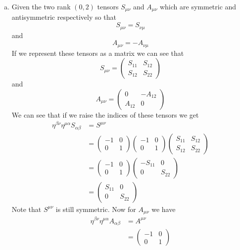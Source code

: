 \documentclass[11pt]{article}
\numberwithin{equation}{section}
\begin{document}
\begin{enumerate}[(a)]
\item
Given the two rank $(0,2)$ tensors $S_{\mu\nu}$ and $A_{\mu\nu}$ which are symmetric and antisymmetric respectively so that
$$S_{\mu\nu} = S_{\nu\mu}$$
and 
$$A_{\mu\nu} = -A_{\nu\mu}$$
If we represent these tensors as a matrix we can see that
$$S_{\mu\nu} = \left(\begin{array}{cc}
		S_{11} 	&S_{12}\\
		S_{12} 	&S_{22}
		\end{array}\right)$$
and
$$A_{\mu\nu} = \left(\begin{array}{cc}
		0 	&-A_{12}\\
		A_{12} 	&0
		\end{array}\right)$$
We can see that if we raise the indices of these tensors we get
\begin{align*}
\eta^{\beta\nu}\eta^{\mu\alpha}S_{\alpha\beta} &= S^{\mu\nu}\\
&=	\left(\begin{array}{cc}
		-1 &0\\
		0 &1 
	\end{array}\right)
	\left(\begin{array}{cccc}
		-1 &0\\
		0 &1 
	\end{array}\right)
	\left(\begin{array}{cc}
		S_{11} 	&S_{12}\\
		S_{12} 	&S_{22}
	\end{array}\right)\\
&= 	\left(\begin{array}{cc}
		-1 &0\\
		0 &1 
	\end{array}\right)
	\left(\begin{array}{cc}
		-S_{11}	&0\\
		0 	&S_{22}
	\end{array}\right)\\
&=	\left(\begin{array}{cc}
		S_{11}	&0\\
		0 	&S_{22}
	\end{array}\right)
\end{align*}
Note that $S^{\mu\nu}$ is still symmetric. Now for $A_{\mu\nu}$ we have
\begin{align*}
\eta^{\beta\nu}\eta^{\mu\alpha}A_{\alpha\beta} &= A^{\mu\nu}\\
&=	\left(\begin{array}{cc}
		-1 &0\\
		0 &1 
	\end{array}\right)

\end{align*}
\end{enumerate}
\end{document}
